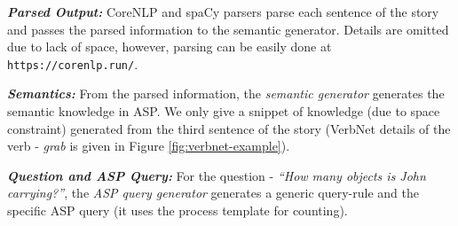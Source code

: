 \documentclass[letterpaper]{article}
\begin{document}
\smallskip
\noindent
\cprotect {}

\smallskip
\noindent \textit{\textbf{Parsed Output: }} CoreNLP and spaCy parsers parse each sentence of the story and passes the parsed information to the semantic generator. Details are omitted due to lack of space, however, parsing can be easily done at \texttt{https://corenlp.run/}.

\noindent \textit{\textbf{Semantics: }}
From the parsed information, the \textit{semantic generator} generates the semantic knowledge in ASP. We only give a snippet of knowledge (due to space constraint) generated from the third sentence of the story (VerbNet details of the verb - \textit{grab} is given in Figure \ref{fig:verbnet-example}).

\smallskip
\noindent
\cprotect {}

\smallskip

\noindent \textit{\textbf{Question and ASP Query: } }
For the question - \textit{``How many objects is John carrying?''}, the\textit{ ASP query generator} generates a generic query-rule and the specific ASP query (it uses the process template for counting).


\smallskip
\noindent
\cprotect {}
\end{document}
